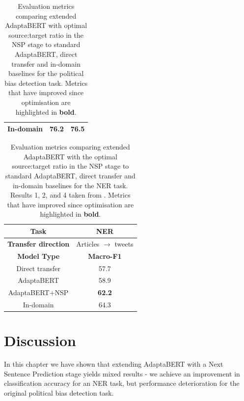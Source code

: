 \begin{table}[ht]
\begin{center}
\begin{tabular}{|c|c|c|c|c|c|}
            \hline
            \multicolumn{2}{|c|}{In-domain} & \multicolumn{2}{|c|}{76.2} & \multicolumn{2}{|c|}{76.5}  \\
            \hline
        \end{tabular}
    \end{center}
    \caption{Evaluation metrics comparing extended AdaptaBERT with optimal source:target ratio in the NSP stage to standard AdaptaBERT, direct transfer and in-domain baselines for the political bias detection task. Metrics that have improved since optimisation are highlighted in \textbf{bold}.}
    \label{tab:adaptabert-nsp-results-best}
\end{table}

\begin{table}[ht]
    \begin{center}
        \begin{tabular}{|c|c|}
            \hline
            \textbf{Task} & NER \\
            \hline
            \textbf{Transfer direction} & Articles $ \rightarrow $ tweets \\
            \hline \hline
            \textbf{Model Type} & \textbf{Macro-F1} \\
            \hline
            Direct transfer & 57.7  \\
            AdaptaBERT & 58.9  \\
            AdaptaBERT+NSP & \textbf{62.2}  \\
            \hline
            In-domain & 64.3 \\
            \hline
        \end{tabular}
    \end{center}
    \caption{Evaluation metrics comparing extended AdaptaBERT with the optimal source:target ratio in the NSP stage to standard AdaptaBERT, direct transfer and in-domain baselines for the NER task. Results 1, 2, and 4 taken from \cite{adaptabert}. Metrics that have improved since optimisation are highlighted in \textbf{bold}.}
    \label{tab:adaptabert-nsp-ner-results-best}
\end{table}

\section{Discussion}

In this chapter we have shown that extending AdaptaBERT with a Next Sentence Prediction stage yields mixed results - we achieve an improvement in classification accuracy for an NER task, but performance deterioration for the original political bias detection task.

